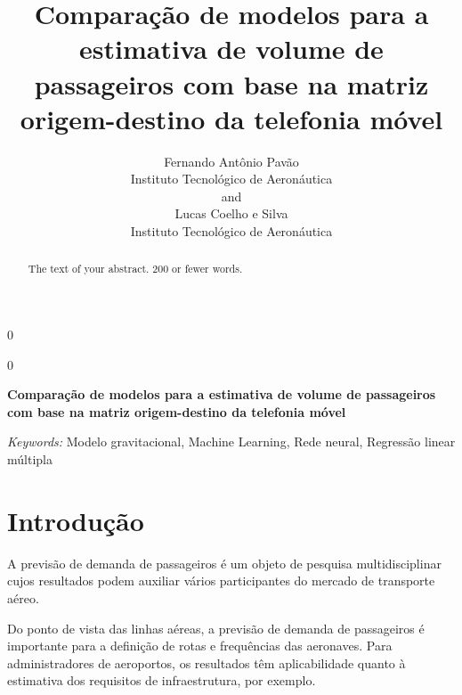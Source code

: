 \documentclass[12pt]{article}
\newcommand{\blind}{0}
\begin{document}
\def\spacingset#1{\renewcommand{\baselinestretch}%
{#1}\small\normalsize} \spacingset{1}



\blind
{
  \title{\bf Comparação de modelos para a estimativa de volume de passageiros com
base na matriz origem-destino da telefonia móvel}

  \author{
        Fernando Antônio Pavão \\
    Instituto Tecnológico de Aeronáutica\\
     and \\     Lucas Coelho e Silva \\
    Instituto Tecnológico de Aeronáutica\\
      }
  \maketitle
} \fi

\blind
{
  \bigskip
  \bigskip
  \bigskip
  \begin{center}
    {\LARGE\bf Comparação de modelos para a estimativa de volume de passageiros com
base na matriz origem-destino da telefonia móvel}
  \end{center}
  \medskip
} \fi

\bigskip
\begin{abstract}
The text of your abstract. 200 or fewer words.
\end{abstract}

\noindent%
{\it Keywords:} Modelo gravitacional, Machine Learning, Rede neural, Regressão linear múltipla
\vfill

\newpage
\spacingset{1.45} %

\hypertarget{introduuxe7uxe3o}{%
\section{Introdução}\label{introduuxe7uxe3o}}

A previsão de demanda de passageiros é um objeto de pesquisa
multidisciplinar cujos resultados podem auxiliar vários participantes do
mercado de transporte aéreo.

Do ponto de vista das linhas aéreas, a previsão de demanda de
passageiros é importante para a definição de rotas e frequências das
aeronaves. Para administradores de aeroportos, os resultados têm
aplicabilidade quanto à estimativa dos requisitos de infraestrutura, por
exemplo.
\end{document}
